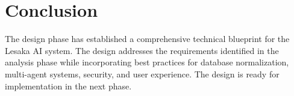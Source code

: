 \section{Conclusion}

The design phase has established a comprehensive technical blueprint for the Lesaka AI system. The design addresses the requirements identified in the analysis phase while incorporating best practices for database normalization, multi-agent systems, security, and user experience. The design is ready for implementation in the next phase.
